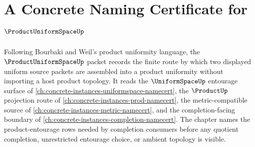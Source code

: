 \chapter{A Concrete Naming Certificate for $\ProductUniformSpaceUp$}
\label{ch:concrete-instances-product-uniform-space-namecert}

Following Bourbaki and Weil's product uniformity language, the $\ProductUniformSpaceUp$ packet records the finite route by which two displayed uniform source packets are assembled into a product uniformity without importing a host product topology. It reads the $\UniformSpaceUp$ entourage surface of \autoref{ch:concrete-instances-uniformspace-namecert}, the $\ProductUp$ projection route of \autoref{ch:concrete-instances-prod-namecert}, the metric-compatible source of \autoref{ch:concrete-instances-metric-namecert}, and the completion-facing boundary of \autoref{ch:concrete-instances-completion-namecert}. The chapter names the product-entourage rows needed by completion consumers before any quotient completion, unrestricted entourage choice, or ambient topology is visible.


